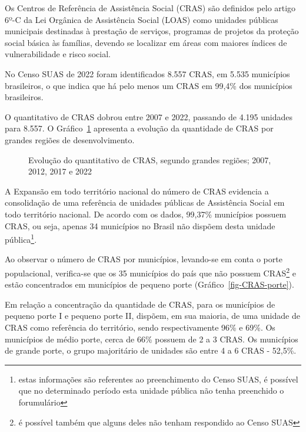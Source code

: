 \documentclass[
  letterpaper,
  DIV=11,
  numbers=noendperiod]{scrreprt}
\begin{document}
Os Centros de Referência de Assistência Social (CRAS) são definidos pelo
artigo 6º-C da Lei Orgânica de Assistência Social (LOAS) como unidades
públicas municipais destinadas à prestação de serviços, programas de
projetos da proteção social básica às famílias, devendo se localizar em
áreas com maiores índices de vulnerabilidade e risco social.

No Censo SUAS de 2022 foram identificados 8.557 CRAS, em 5.535
municípios brasileiros, o que indica que há pelo menos um CRAS em 99,4\%
dos municípios brasileiros.

O quantitativo de CRAS dobrou entre 2007 e 2022, passando de 4.195
unidades para 8.557. O Gráfico~\ref{fig-quantitativo-CRAS} apresenta a
evolução da quantidade de CRAS por grandes regiões de desenvolvimento.

\begin{figure}


\caption{\label{fig-quantitativo-CRAS}Evolução do quantitativo de CRAS,
segundo grandes regiões; 2007, 2012, 2017 e 2022}

\end{figure}%

A Expansão em todo território nacional do número de CRAS evidencia a
consolidação de uma referência de unidades públicas de Assistência
Social em todo território nacional. De acordo com os dados, 99,37\%
municípios possuem CRAS, ou seja, apenas 34 municípios no Brasil não
dispõem desta unidade pública\footnote{estas informações são referentes
  ao preenchimento do Censo SUAS, é possível que no determinado período
  esta unidade pública não tenha preenchido o forumulário}.

Ao observar o número de CRAS por municípios, levando-se em conta o porte
populacional, verifica-se que os 35 municípios do país que não possuem
CRAS\footnote{é possível também que alguns deles não tenham respondido
  ao Censo SUAS} e estão concentrados em municípios de pequeno porte
(Gráfico~\ref{fig-CRAS-porte}).

Em relação a concentração da quantidade de CRAS, para os municípios de
pequeno porte I e pequeno porte II, dispõem, em sua maioria, de uma
unidade de CRAS como referência do território, sendo respectivamente
96\% e 69\%. Os municípios de médio porte, cerca de 66\% possuem de 2 a
3 CRAS. Os municípios de grande porte, o grupo majoritário de unidades
são entre 4 a 6 CRAS - 52,5\%.
\end{document}

